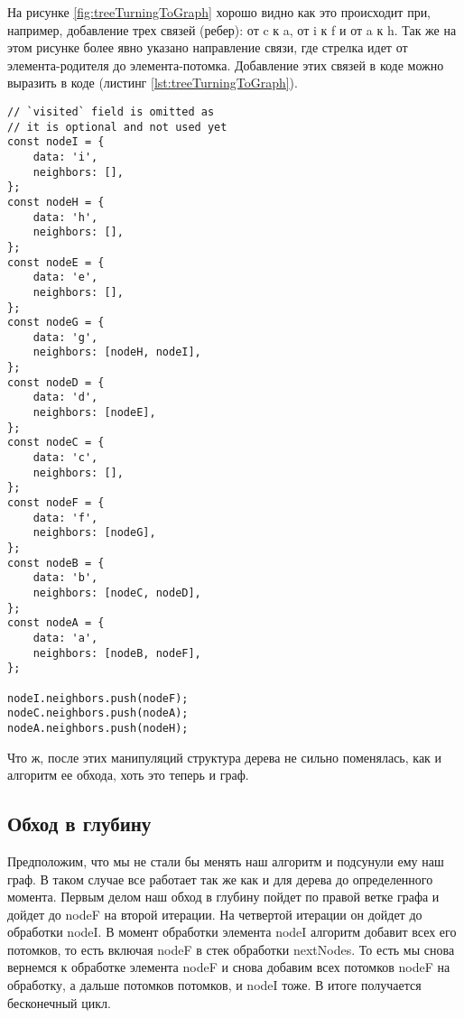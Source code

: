 \documentclass[../article.tex]{subfiles}
\begin{document}
На рисунке \ref{fig:treeTurningToGraph} хорошо видно как это происходит при, например, добавление трех связей (ребер): от {\firacodebold c} к {\firacodebold a}, от {\firacodebold i} к {\firacodebold f} и от {\firacodebold a} к {\firacodebold h}. Так же на этом рисунке более явно указано направление связи, где стрелка идет от элемента-родителя до элемента-потомка. Добавление этих связей в коде можно выразить в коде (листинг \ref{lst:treeTurningToGraph}).

\begin{ruledelement}
    \begin{lstlisting}[caption={Добавление связей превращающих дерево в грфа}, label={lst:treeTurningToGraph}]
// `visited` field is omitted as
// it is optional and not used yet
const nodeI = {
    data: 'i',
    neighbors: [],
};
const nodeH = {
    data: 'h',
    neighbors: [],
};
const nodeE = {
    data: 'e',
    neighbors: [],
};
const nodeG = {
    data: 'g',
    neighbors: [nodeH, nodeI],
};
const nodeD = {
    data: 'd',
    neighbors: [nodeE],
};
const nodeC = {
    data: 'c',
    neighbors: [],
};
const nodeF = {
    data: 'f',
    neighbors: [nodeG],
};
const nodeB = {
    data: 'b',
    neighbors: [nodeC, nodeD],
};
const nodeA = {
    data: 'a',
    neighbors: [nodeB, nodeF],
};

nodeI.neighbors.push(nodeF);
nodeC.neighbors.push(nodeA);
nodeA.neighbors.push(nodeH);
    \end{lstlisting}
\end{ruledelement}


Что ж, после этих манипуляций структура дерева не сильно поменялась, как и алгоритм ее обхода, хоть это теперь и граф.

\subsection{Обход в глубину}

Предположим, что мы не стали бы менять наш алгоритм и подсунули ему наш граф. В таком случае все работает так же как и для дерева до определенного момента. Первым делом наш обход в глубину пойдет по правой ветке графа и дойдет до {\firacodebold nodeF} на второй итерации. На четвертой итерации он дойдет до обработки {\firacodebold nodeI}. В момент обработки элемента {\firacodebold nodeI} алгоритм добавит всех его потомков, то есть включая {\firacodebold nodeF} в стек обработки {\firacodebold nextNodes}. То есть мы снова вернемся к обработке элемента {\firacodebold nodeF} и снова добавим всех потомков {\firacodebold nodeF} на обработку, а дальше потомков потомков, и {\firacodebold nodeI} тоже. В итоге получается бесконечный цикл.
\end{document}
